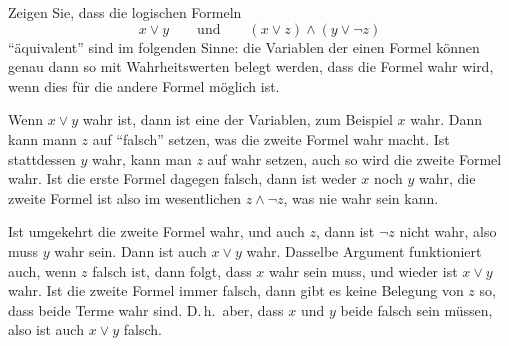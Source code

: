 Zeigen Sie, dass die logischen Formeln
\[
x\vee y\qquad\text{und}\qquad (x\vee z)\wedge (y\vee \neg z)
\]
``äquivalent'' sind im folgenden Sinne: die Variablen der einen Formel
können genau dann so mit Wahrheitswerten
belegt werden, dass die Formel wahr wird, wenn dies für die andere Formel
möglich ist.


\begin{loesung}
Wenn $x\vee y$ wahr ist, dann ist eine der Variablen, zum Beispiel
$x$ wahr.
Dann kann mann $z$ auf ``falsch'' setzen, was die zweite Formel wahr macht.
Ist stattdessen $y$ wahr, kann man $z$ auf wahr setzen, auch so wird die
zweite Formel wahr.
Ist die erste Formel dagegen falsch, dann ist weder $x$ noch $y$ wahr,
die zweite Formel ist also im wesentlichen $z\wedge \neg z$, was nie
wahr sein kann.

Ist umgekehrt die zweite Formel wahr, und auch $z$, dann ist $\neg z$ nicht 
wahr, also muss $y$ wahr sein. Dann ist auch $x\vee y$ wahr. Dasselbe
Argument funktioniert auch, wenn $z$ falsch ist, dann folgt, dass $x$
wahr sein muss, und wieder ist $x\vee y$ wahr.
Ist die zweite Formel immer falsch, dann gibt es keine Belegung von
$z$ so, dass beide Terme wahr sind.
D.\,h.~aber, dass $x$ und $y$ beide falsch sein müssen, also ist auch
$x\vee y$ falsch.


\end{loesung}
